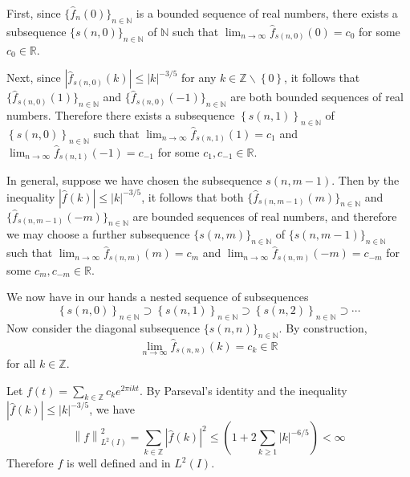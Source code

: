 \documentclass[answers]{exam}
\theoremstyle{problemstyle}
\newcommand{\norm}[1]{\left\lVert#1\right\rVert} %
\newcommand{\1}[1]{\textbf{1}_{\left[#1\right]}} %
\def\limn{\lim_{n\to\infty}} %
\def\R{\mathbb{R}} %
\def\Z{\mathbb{Z}} %
\begin{document}
\begin{questions}
\begin{parts}
\begin{solution}
  
  First, since $\{\hat{f}_{n}(0)\}_{n\in\mathbb{N}}$ is a bounded sequence of real numbers, there exists a subsequence $\{s(n,0)\}_{n\in \mathbb{N}}$ of $\mathbb{N}$ such that $\limn \hat{f}_{s(n,0)}(0)= c_{0}$ for some $c_{0}\in \R$.

  Next, since $|\hat{f}_{s(n,0)}(k)|\leq |k|^{-3/5}$ for any $k\in \Z\backslash \left\{ 0 \right\}$, it follows that  $\{\hat{f}_{s(n,0)}(1)\}_{n\in\mathbb{N}}$ and $\{\hat{f}_{s(n,0)}(-1)\}_{n\in\mathbb{N}}$ are both bounded sequences of real numbers. Therefore there exists a subsequence $\left\{ s(n,1) \right\}_{n\in \mathbb{N}}$ of  $\left\{ s(n,0) \right\}_{n\in \mathbb{N}}$ such that $\limn \hat{f}_{s(n,1)}(1) = c_{1}$ and $\limn \hat{f}_{s(n,1)}(-1) = c_{-1}$ for some $c_{1},c_{-1}\in \R$.
  
  In general, suppose we have chosen the subsequence $s(n,m-1)$. Then by the inequality $|\hat{f}(k)|\leq |k|^{-3/5}$, it follows that both $\{\hat{f}_{s(n,m-1)}(m)\}_{n\in\mathbb{N}}$ and $\{\hat{f}_{s(n,m-1)}(-m)\}_{n\in\mathbb{N}}$ are bounded sequences of real numbers, and therefore we may choose a further subsequence $\{s(n,m)\}_{n\in\mathbb{N}}$ of $\{s(n,m-1)\}_{n\in\mathbb{N}}$ such that 
  $\limn \hat{f}_{s(n,m)}(m) = c_{m}$ and $\limn \hat{f}_{s(n,m)}(-m) = c_{-m}$ for some $c_{m},c_{-m}\in \R$.

  We now have in our hands a nested sequence of subsequences
  \begin{equation*}
    \left\{ s(n,0) \right\}_{n\in\mathbb{N}}\supset  \left\{ s(n,1) \right\}_{n\in\mathbb{N}}\supset \left\{ s(n,2) \right\}_{n\in\mathbb{N}}\supset \cdots
  \end{equation*}
  Now consider the diagonal subsequence $\{s(n,n)\}_{n\in \mathbb{N}}$. By construction,
  \begin{equation}
    \label{eq:1}
    \lim_{n\to\infty} \hat{f}_{s(n,n)}(k) =c_{k}\in \R
  \end{equation}
  for all $k\in \Z$.

  Let $f(t)=\sum_{k\in\Z} c_{k}e^{2\pi i k t}$. By Parseval's identity and the inequality $|\hat{f}(k)|\leq |k|^{-3/5}$, we have
  \begin{equation*}
    \norm{f}^{2}_{L^{2}(I)} =  \sum_{k\in\Z}|\hat{f}(k)|^{2} \leq  \left( 1 + 2\sum_{k\geq 1}|k|^{-6/5} \right)<\infty
  \end{equation*}
  Therefore $f$ is well defined and in $L^{2}(I)$.
  

\end{solution}
\end{parts}
\end{questions}
\end{document}
